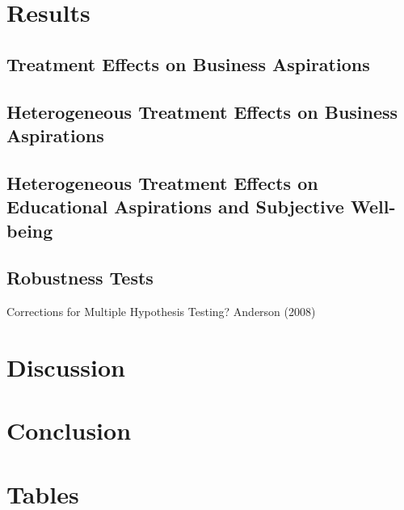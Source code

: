 \documentclass[11.5pt]{article}
\begin{document}
{\section{Results}

\subsection{Treatment Effects on Business Aspirations}

\subsection{Heterogeneous Treatment Effects on Business Aspirations}

\subsection{Heterogeneous Treatment Effects on Educational Aspirations and Subjective Well-being}

\subsection{Robustness Tests}

Corrections for Multiple Hypothesis Testing? Anderson (2008)

\section{Discussion}

\section{Conclusion}




\pagebreak




\clearpage




\onehalfspacing
\section*{Tables} \label{sec:tab}

\clearpage{}
\begin{appendices}



\end{appendices}}
\end{document}
